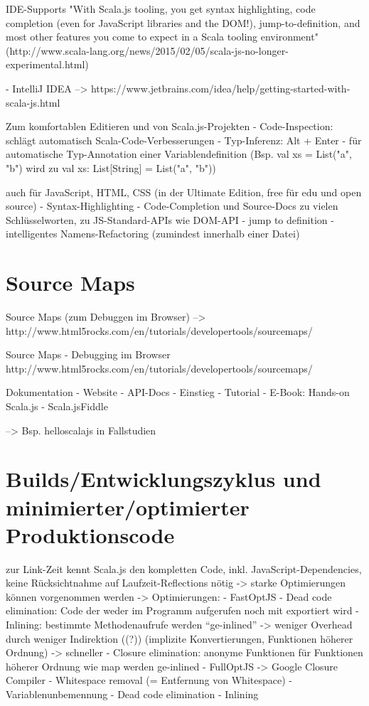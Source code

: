 \documentclass[a4paper, 12pt, hidelinks, listof=totoc, listoftables=totoc, bibliography=totoc]{scrreprt}
\begin{document}
IDE-Supports
  "With Scala.js tooling, you get syntax highlighting, code completion (even for JavaScript libraries and the DOM!), jump-to-definition, and most other features you come to expect in a Scala tooling environment" (http://www.scala-lang.org/news/2015/02/05/scala-js-no-longer-experimental.html)

  - IntelliJ IDEA  -->  https://www.jetbrains.com/idea/help/getting-started-with-scala-js.html

    Zum komfortablen Editieren und von Scala.js-Projekten
    - Code-Inspection: schlägt automatisch Scala-Code-Verbesserungen
    - Typ-Inferenz: Alt + Enter - für automatische Typ-Annotation einer Variablendefinition (Bsp. val xs = List("a", "b") wird zu val xs: List[String] = List("a", "b"))

    auch für JavaScript, HTML, CSS (in der Ultimate Edition, free für edu und open source)
      - Syntax-Highlighting
      - Code-Completion und Source-Docs zu vielen Schlüsselworten, zu JS-Standard-APIs wie DOM-API
      - jump to definition
      - intelligentes Namens-Refactoring (zumindest innerhalb einer Datei)


\section{Source Maps}

Source Maps (zum Debuggen im Browser)  -->  http://www.html5rocks.com/en/tutorials/developertools/sourcemaps/

Source Maps
  - Debugging im Browser
  http://www.html5rocks.com/en/tutorials/developertools/sourcemaps/

Dokumentation
  - Website
  - API-Docs
  - Einstieg
    - Tutorial
    - E-Book: Hands-on Scala.js
    - Scala.jsFiddle

--> Bsp. helloscalajs in Fallstudien


\section{Builds/Entwicklungszyklus und minimierter/optimierter Produktionscode}
\label{sec:compiler}

zur Link-Zeit kennt Scala.js den kompletten Code, inkl. JavaScript-Dependencies, keine Rücksichtnahme auf Laufzeit-Reflections nötig -> starke Optimierungen können vorgenommen werden
\cite[Folie 45 ff., Min. 36]{doeraene2015.SSP}
	-> Optimierungen:
		- FastOptJS
			- Dead code elimination: Code der weder im Programm aufgerufen noch mit \@JSExported exportiert wird
			- Inlining: bestimmte Methodenaufrufe werden "`ge-inlined"' -> weniger Overhead durch weniger Indirektion ((?)) (implizite Konvertierungen, Funktionen höherer Ordnung) -> schneller
			- Closure elimination: anonyme Funktionen für Funktionen höherer Ordnung wie map werden ge-inlined
		- FullOptJS -> Google Closure Compiler
			- Whitespace removal (= Entfernung von Whitespace)
			- Variablenunbemennung
			- Dead code elimination
			- Inlining
		\cite[\#HowCompilationWorks]{haoyi.HOS}
\end{document}
